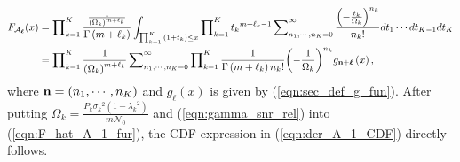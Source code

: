 \documentclass[12pt,onecolumn,draftcls]{IEEEtran}
\newcommand{\bs}{\boldsymbol}
\begin{document}
\begin{align}\label{eqn:F_hat_A_1_fur}
{F_{{{ {\mathcal A}}_{\bs{\ell}}}}}(x)
&= \prod\nolimits_{k = 1}^K {\frac{{\frac{1}{{{{\left( {{\Omega _k}} \right)}^{m + {\ell_k}}}}}}}{{\Gamma \left( {m + {\ell_k}} \right)}}}
 \int\nolimits_{\prod\nolimits_{k = 1}^K {\left( {1 + {t_k}} \right)}  \le x} {\prod\nolimits_{k = 1}^K {{t_k}^{m + {\ell_k} - 1}\sum\nolimits_{{n_1}, \cdots ,{n_K} = 0}^\infty  {\frac{{{{\left( { - \frac{{{t_k}}}{{{\Omega _k}}}} \right)}^{{n_k}}}}}{{{n_k}!}}} } d{t_1} \cdots d{t_{K - 1}}d{t_K}}  \notag\\
 &= \prod\nolimits_{k = 1}^K {\frac{1}{{{{\left( {{\Omega _k}} \right)}^{m + {\ell_k}}}}}} \sum\nolimits_{{n_1}, \cdots ,{n_K} = 0}^\infty  {\prod\nolimits_{k = 1}^K {\frac{1}{{\Gamma \left( {m + {\ell_k}} \right){n_k}!}}{{\left( { - \frac{1}{{{\Omega _k}}}} \right)}^{{n_k}}}} } {g_{{\bf{n}} + {\bs{\ell}}}}\left( x \right),
\end{align}
where ${\bf n} = (n_1,\cdots,n_K)$ and ${g_{{\bs{\ell}}}}\left( x \right)$ is given by (\ref{eqn:sec_def_g_fun}). After putting $\Omega _k = \frac{{P_k}{\sigma _k}^2\left( {1 - {\lambda _k}^2} \right)}{m\mathcal N_0}$ and (\ref{eqn:gamma_snr_rel}) into (\ref{eqn:F_hat_A_1_fur}), the CDF expression in (\ref{eqn:der_A_1_CDF}) directly follows.
\end{document}
